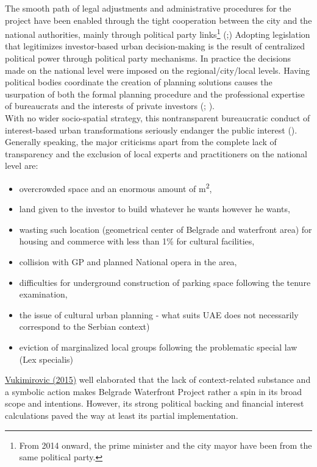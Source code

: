 \documentclass[11pt]{report}
\begin{document}
\begin{itemize}
The smooth path of legal adjustments and administrative procedures for the project have been enabled through the tight cooperation between the city and the national authorities, mainly through political party links\footnote{From 2014 onward, the prime minister and the city mayor have been from the same political party.}
(\href{Maruna}{\citealt{maruna_can_2015}};\href{Peric}{\citealt{peric_evolution_2016}})
Adopting legislation that legitimizes investor-based urban decision-making is the result of centralized political power through political party mechanisms. In practice the decisions made on the national level were imposed on the regional/city/local levels. Having political bodies coordinate the creation of planning solutions causes the usurpation of both the formal planning procedure and the professional expertise of bureaucrats and the interests of private investors (\href{Maruna}{\citealt{maruna_can_2015}}; \href{Peric}{\citealt{peric_evolution_2016}}).
\\

With no wider socio-spatial strategy, this nontransparent bureaucratic conduct of interest-based urban transformations seriously endanger the public interest (\href{Vukmirovic}{\citealt{doytchinov_belgrade:_2015}}). 
Generally speaking, the major criticisms apart from the complete lack of transparency and the exclusion of local experts and practitioners on the national level are:

\begin{itemize}
\item overcrowded space and an enormous amount of m\textsuperscript{2},
\item land given to the investor to build whatever he wants however he wants,
\item wasting such location (geometrical center of Belgrade and waterfront area) for housing and commerce with less than 1\% for cultural facilities,
\item collision with GP and planned National opera in the area,
\item difficulties for underground construction of parking space following the tenure examination,
\item the issue of cultural urban planning - what suits UAE does not necessarily correspond to the Serbian context)
\item eviction of marginalized local groups following the problematic special law (Lex specialis)
\end{itemize}

\href{Vukmirovic}{Vukimirovic (2015)}
well elaborated that the lack of context-related substance and a symbolic action makes Belgrade Waterfront Project rather a spin in its broad scope and intentions. However, its strong political backing and financial interest calculations paved the way at least its partial implementation.
\end{itemize}
\end{document}

